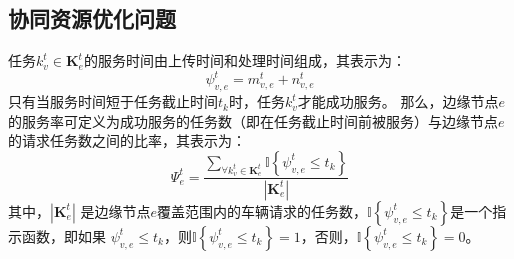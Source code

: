 \subsection{协同资源优化问题}

任务$k_v^t \in \mathbf{K}_{e}^{t}$的服务时间由上传时间和处理时间组成，其表示为：
\begin{equation}
	\psi_{v, e}^{t} = m_{v, e}^{t} +  n_{v, e}^{t}
	\label{equ 3-10}
\end{equation}
只有当服务时间短于任务截止时间$t_k$时，任务$k_v^t$才能成功服务。
那么，边缘节点$e$的服务率可定义为成功服务的任务数（即在任务截止时间前被服务）与边缘节点$e$的请求任务数之间的比率，其表示为：
\begin{equation}
	\Psi_{e}^{t} = \frac{\sum_{\forall k_{v}^{t} \in \mathbf{K}_{e}^{t}} \mathbb{I} \left\{ \psi_{v, e}^{t} \leq t_{k} \right\} }{|\mathbf{K}_{e}^{t}|}
	\label{equ 3-11}
\end{equation}
\noindent 其中，$|\mathbf{K}_{e}^{t}|$ 是边缘节点$e$覆盖范围内的车辆请求的任务数，$\mathbb{I} \left\{ \psi_{v, e}^{t} \leq t_{k} \right\}$是一个指示函数，即如果 $\psi_{v, e}^{t} \leq t_{k}$，则$\mathbb{I} \left\{ \psi_{v, e}^{t} \leq t_{k} \right\} =1$，否则，$\mathbb{I} \left\{ \psi_{v, e}^{t} \leq t_{k} \right\} =0$。

